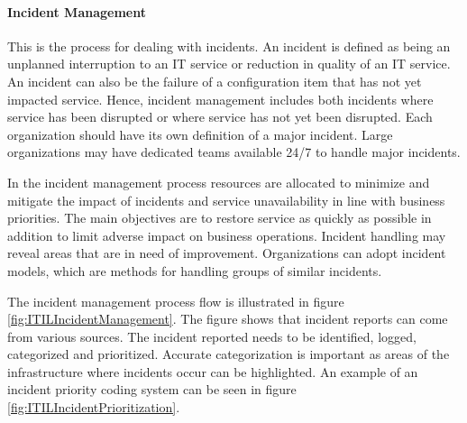 \paragraph{Incident Management}
This is the process for dealing with incidents. An incident is defined as being an unplanned interruption to an IT service or reduction in quality of an IT service. An incident can also be the failure of a configuration item that has not yet impacted service. Hence, incident management includes both incidents where service has been disrupted or where service has not yet been disrupted. Each organization should have its own definition of a major incident. Large organizations may have dedicated teams available 24/7 to handle major incidents. 

In the incident management process resources are allocated to minimize and mitigate the impact of incidents and service unavailability in line with business priorities. The main objectives are to restore service as quickly as possible in addition to limit adverse impact on business operations. Incident handling may reveal areas that are in need of improvement. Organizations can adopt incident models, which are methods for handling groups of similar incidents.

The incident management process flow is illustrated in figure \ref{fig:ITILIncidentManagement}. The figure shows that incident reports can come from various sources. The incident reported needs to be identified, logged, categorized and prioritized. Accurate categorization is important as areas of the infrastructure where incidents occur can be highlighted. An example of an incident priority coding system can be seen in figure \ref{fig:ITILIncidentPrioritization}.

